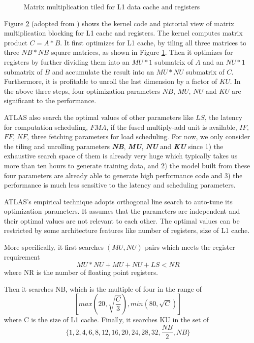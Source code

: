 \begin{figure}
\begin{subfigure}[t]{1.0\linewidth}
    \caption{}
    \label{fig:ATLAS_pic}
  \end{subfigure}
  \caption{Matrix multiplication tiled for L1 data cache and registers}
  \label{fig:ATLAS}
\end{figure}

  Figure \ref{fig:ATLAS} (adopted from \cite{yotov2005search}) shows the kernel code and pictorial view of matrix multiplication 
  blocking for L1 cache and registers. The kernel computes matrix product $C=A*B$. It first optimizes for L1 cache, by tiling all three matrices
  to three $NB*NB$ square matrices, as shown in Figure \ref{fig:ATLAS_pic}. Then it optimizes for registers by further dividing them  
  into an $MU*1$ submatrix of $A$ and an $NU*1$ submatrix of $B$ and accumulate the result into an $MU*NU$ submatrix of $C$. 
  Furthermore, it is profitable to unroll the last dimension by a factor of $KU$.
  In the above three steps, four optimization parameters $NB$, $MU$, $NU$ and $KU$ are significant to the performance. \par

  ATLAS also search the optimal values of other parameters like $LS$, the latency for computation scheduling, $FMA$, if the fused multiply-add unit is available, $IF$, $FF$, $NF$, three fetching parameters 
  for load scheduling. For now, we only consider the tiling and unrolling parameters \textbf{\textit{NB}}, \textbf{\textit{MU}}, \textbf{\textit{NU}} and \textbf{\textit{KU}} since 1) the exhaustive search space of them 
  is already very huge which typically takes us more than ten hours to generate training data, and 2) the model built from these four parameters are already able to
  generate high performance code and 3) the performance is much less sensitive to the latency and scheduling parameters.
  \par
  
  ATLAS's empirical technique adopts orthogonal line search to auto-tune its optimization parameters. 
  It assumes that the parameters are independent and their optimal values are not relevant to each other. The optimal values can be
  restricted by some architecture features like number of registers, size of L1 cache.\par
  More specifically, it first searches $(MU, NU)$ pairs which meets the register requirement
  \[ MU*NU + MU + NU + LS < NR \]
  where NR is the number of floating point registers.\par
  Then it searches NB, which is the multiple of four in the range of 
  \[ [max(20, \sqrt{\frac{C}{3}}), min(80, \sqrt{C}) ] \]
  where C is the size of L1 cache. 
  Finally, it searches KU in the set of 
  \[ \{1, 2, 4, 6, 8, 12, 16, 20, 24, 28, 32, \frac{NB}{2}, NB \} \]


